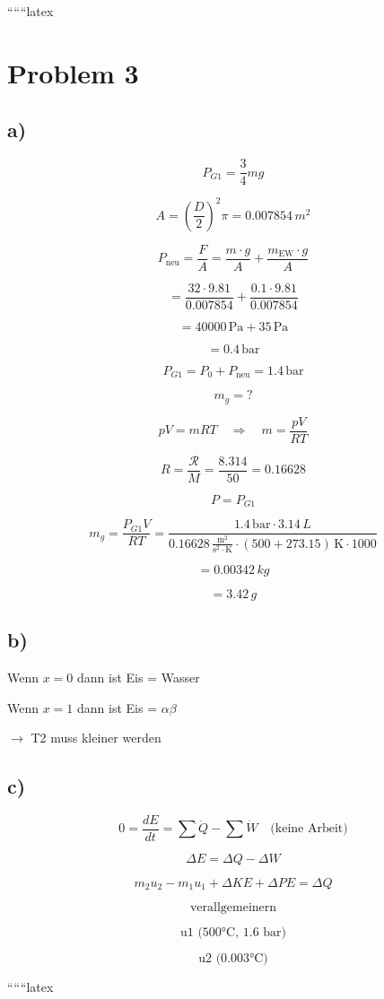 
``````latex


\section*{Problem 3}

\subsection*{a)}

\[ P_{G1} = \frac{3}{4} mg \]

\[ A = \left( \frac{D}{2} \right)^2 \pi = 0.007854 \, m^2 \]

\[ P_{\text{neu}} = \frac{F}{A} = \frac{m \cdot g}{A} + \frac{m_{\text{EW}} \cdot g}{A} \]

\[ = \frac{32 \cdot 9.81}{0.007854} + \frac{0.1 \cdot 9.81}{0.007854} \]

\[ = 40000 \, \text{Pa} + 35 \, \text{Pa} \]

\[ = 0.4 \, \text{bar} \]

\[ P_{G1} = P_0 + P_{\text{neu}} = 1.4 \, \text{bar} \]

\[ m_g = ? \]

\[ pV = m R T \quad \Rightarrow \quad m = \frac{pV}{R T} \]

\[ R = \frac{\mathcal{R}}{M} = \frac{8.314}{50} = 0.16628 \]

\[ P = P_{G1} \]

\[ m_g = \frac{P_{G1} V}{R T} = \frac{1.4 \, \text{bar} \cdot 3.14 \, L}{0.16628 \, \frac{\text{m}^2}{\text{s}^2 \cdot \text{K}} \cdot (500 + 273.15) \, \text{K} \cdot 1000} \]

\[ = 0.00342 \, kg \]

\[ = 3.42 \, g \]

\subsection*{b)}

Wenn $x = 0$ dann ist Eis = Wasser

Wenn $x = 1$ dann ist Eis = \(\alpha \beta\)

\(\rightarrow\) T2 muss kleiner werden

\subsection*{c)}

\[ 0 = \frac{dE}{dt} = \sum \dot{Q} - \sum \dot{W} \quad \text{(keine Arbeit)} \]

\[ \Delta E = \Delta Q - \Delta W \]

\[ m_2 u_2 - m_1 u_1 + \Delta KE + \Delta PE = \Delta Q \]

\[ \text{verallgemeinern} \]

\[ \text{u1 (500°C, 1.6 bar)} \]

\[ \text{u2 (0.003°C)} \]

``````latex


